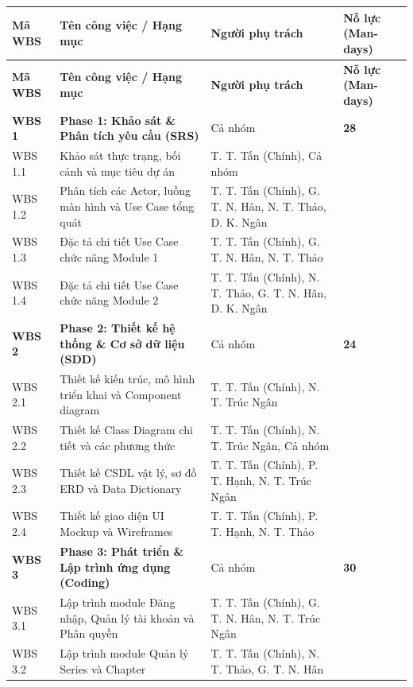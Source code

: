 \renewcommand{\arraystretch}{1.3}
\begin{longtable}{|>{\centering\arraybackslash}p{1.5cm}|>{\raggedright\arraybackslash}p{7.4cm}|>{\raggedright\arraybackslash}p{4.3cm}|>{\centering\arraybackslash}p{2.4cm}|}
\hline
\rowcolor{tableheader}
\textbf{Mã WBS} & \textbf{Tên công việc / Hạng mục} & \textbf{Người phụ trách} & \textbf{Nỗ lực (Man-days)} \\ \hline
\endfirsthead
\hline
\rowcolor{tableheader}
\textbf{Mã WBS} & \textbf{Tên công việc / Hạng mục} & \textbf{Người phụ trách} & \textbf{Nỗ lực (Man-days)} \\ \hline
\endhead

\textbf{WBS 1} & \textbf{Phase 1: Khảo sát \& Phân tích yêu cầu (SRS)} & Cả nhóm & \textbf{28} \\ \hline
WBS 1.1 & Khảo sát thực trạng, bối cảnh và mục tiêu dự án & T. T. Tấn (Chính), Cả nhóm & 4 \\ \hline
WBS 1.2 & Phân tích các Actor, luồng màn hình và Use Case tổng quát & T. T. Tấn (Chính), G. T. N. Hân, N. T. Thảo, D. K. Ngân & 6 \\ \hline
WBS 1.3 & Đặc tả chi tiết Use Case chức năng Module 1 & T. T. Tấn (Chính), G. T. N. Hân, N. T. Thảo & 8 \\ \hline
WBS 1.4 & Đặc tả chi tiết Use Case chức năng Module 2 & T. T. Tấn (Chính), N. T. Thảo, G. T. N. Hân, D. K. Ngân & 10 \\ \hline
\textbf{WBS 2} & \textbf{Phase 2: Thiết kế hệ thống \& Cơ sở dữ liệu (SDD)} & Cả nhóm & \textbf{24} \\ \hline
WBS 2.1 & Thiết kế kiến trúc, mô hình triển khai và Component diagram & T. T. Tấn (Chính), N. T. Trúc Ngân & 6 \\ \hline
WBS 2.2 & Thiết kế Class Diagram chi tiết và các phương thức & T. T. Tấn (Chính), N. T. Trúc Ngân, Cả nhóm & 6 \\ \hline
WBS 2.3 & Thiết kế CSDL vật lý, sơ đồ ERD và Data Dictionary & T. T. Tấn (Chính), P. T. Hạnh, N. T. Trúc Ngân & 6 \\ \hline
WBS 2.4 & Thiết kế giao diện UI Mockup và Wireframes & T. T. Tấn (Chính), P. T. Hạnh, N. T. Thảo & 6 \\ \hline
\textbf{WBS 3} & \textbf{Phase 3: Phát triển \& Lập trình ứng dụng (Coding)} & Cả nhóm & \textbf{30} \\ \hline
WBS 3.1 & Lập trình module Đăng nhập, Quản lý tài khoản và Phân quyền & T. T. Tấn (Chính), G. T. N. Hân, N. T. Trúc Ngân & 8 \\ \hline
WBS 3.2 & Lập trình module Quản lý Series và Chapter & T. T. Tấn (Chính), N. T. Thảo, G. T. N. Hân & 6 \\ \hline

\end{longtable}

